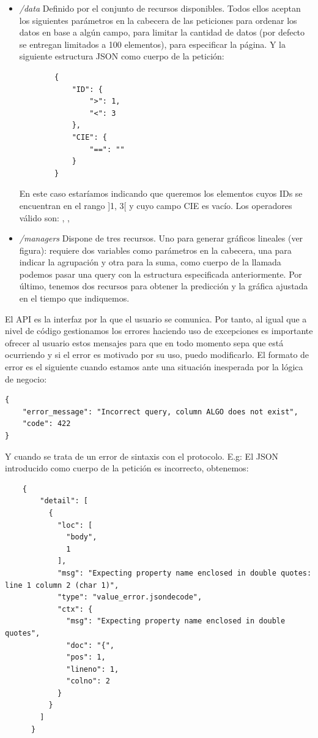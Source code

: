 \begin{itemize}
    \item \textit{/data} Definido por el conjunto de recursos disponibles. Todos ellos aceptan los siguientes parámetros en la cabecera de las peticiones  para ordenar los datos en base a algún campo,  para limitar la cantidad de datos (por defecto se entregan limitados a 100 elementos),  para especificar la página.
    Y la siguiente estructura JSON como cuerpo de la petición:
    \begin{verbatim}
        {
            "ID": {
                ">": 1,
                "<": 3
            },
            "CIE": {
                "==": ""
            }
        }
    \end{verbatim}
    En este caso estaríamos indicando que queremos los elementos cuyos IDs se encuentran en el rango ]1, 3[ y cuyo campo CIE es vacío. Los operadores válido son: \codeword{==}, \codeword{<}, \codeword{>}

    \item \textit{/managers} Dispone de tres recursos. Uno para generar gráficos lineales (ver figura): requiere dos variables como parámetros en la cabecera, una para indicar la agrupación y otra para la suma, como cuerpo de la llamada podemos pasar una query con la estructura especificada anteriormente. Por último, tenemos dos recursos para obtener la predicción y la gráfica ajustada en el tiempo que indiquemos.
\end{itemize}

El API es la interfaz por la que el usuario se comunica. Por tanto, al igual que a nivel de código gestionamos los errores haciendo uso de excepciones es importante ofrecer al usuario estos mensajes para que en todo momento sepa que está ocurriendo y si el error es motivado por su uso, puedo modificarlo. El formato de error es el siguiente cuando estamos ante una situación inesperada por la lógica de negocio:
\begin{verbatim}
{
    "error_message": "Incorrect query, column ALGO does not exist",
    "code": 422
}
\end{verbatim}
Y cuando se trata de un error de sintaxis con el protocolo. E.g: El JSON introducido como cuerpo de la petición es incorrecto, obtenemos:
\begin{verbatim}
    {
        "detail": [
          {
            "loc": [
              "body",
              1
            ],
            "msg": "Expecting property name enclosed in double quotes: line 1 column 2 (char 1)",
            "type": "value_error.jsondecode",
            "ctx": {
              "msg": "Expecting property name enclosed in double quotes",
              "doc": "{",
              "pos": 1,
              "lineno": 1,
              "colno": 2
            }
          }
        ]
      }
\end{verbatim}


